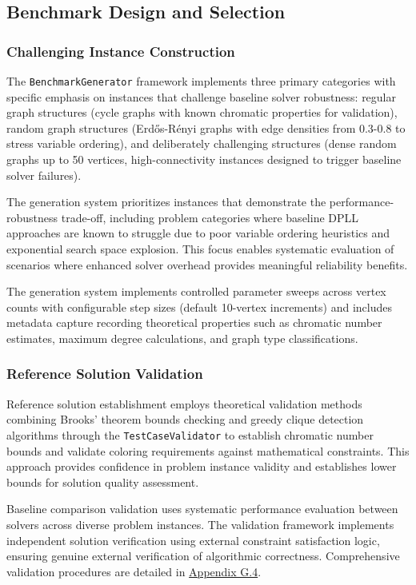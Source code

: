 \subsection{Benchmark Design and Selection}
\label{sec:benchmark-design}

\subsubsection{Challenging Instance Construction}
\label{sec:benchmark-construction}
The \texttt{BenchmarkGenerator} framework implements three primary categories with specific emphasis on instances that challenge baseline solver robustness: regular graph structures (cycle graphs with known chromatic properties for validation), random graph structures (Erdős-Rényi graphs with edge densities from 0.3-0.8 to stress variable ordering), and deliberately challenging structures (dense random graphs up to 50 vertices, high-connectivity instances designed to trigger baseline solver failures).

The generation system prioritizes instances that demonstrate the performance-robustness trade-off, including problem categories where baseline DPLL approaches are known to struggle due to poor variable ordering heuristics and exponential search space explosion. This focus enables systematic evaluation of scenarios where enhanced solver overhead provides meaningful reliability benefits.

The generation system implements controlled parameter sweeps across vertex counts with configurable step sizes (default 10-vertex increments) and includes metadata capture recording theoretical properties such as chromatic number estimates, maximum degree calculations, and graph type classifications.

\subsubsection{Reference Solution Validation}
\label{sec:reference-validation}
Reference solution establishment employs theoretical validation methods combining Brooks' theorem bounds checking and greedy clique detection algorithms through the \texttt{Test\-Case\-Validator} to establish chromatic number bounds and validate coloring requirements against mathematical constraints. This approach provides confidence in problem instance validity and establishes lower bounds for solution quality assessment.

Baseline comparison validation uses systematic performance evaluation between solvers across diverse problem instances. The validation framework implements independent solution verification using external constraint satisfaction logic, ensuring genuine external verification of algorithmic correctness. Comprehensive validation procedures are detailed in \hyperref[appendix:test-validation]{Appendix G.4}.


